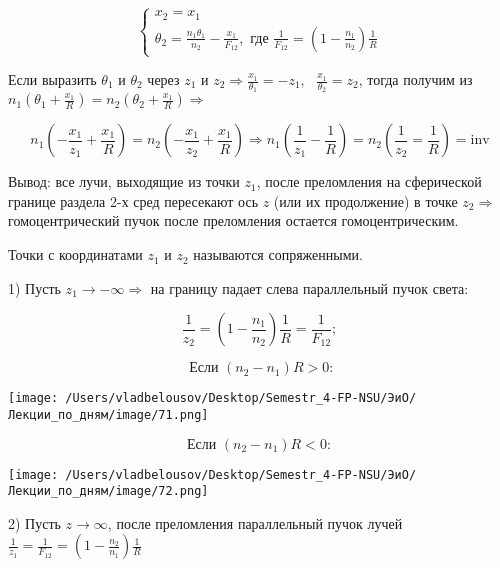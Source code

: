 \documentclass[12pt, a4paper]{report}
\begin{document}
\fi


\[ \begin{cases}
    x_2 =x_1  \\ 
    \displaystyle \theta_2 = \frac{n_1 \theta_1 }{n_2 } - \frac{x_1}{F_{12} } , \text{ где } \frac{1}{F_{12} } = \left( 1 - \frac{n_1}{n_2 }  \right)\frac{1}{R}    
\end{cases} \] 

Если выразить \( \theta_1  \) и \( \theta_2 \)  через \( z_1  \) и \(\displaystyle  z_2 \Rightarrow \frac{x_1}{\theta_1 } = -z_1 ,\text{ } \frac{x_1}{\theta_2 } = z_2    \), тогда получим из \( \displaystyle n_1 \left( \theta_1 +\frac{x_1}{R }\right) = n_2 \left( \theta_2 + \frac{x_1}{R }   \right)  \Rightarrow \)  

\[ n_1\left( - \frac{x_1}{z_1 } + \frac{x_1}{R }      \right) = n_2 \left( - \frac{x_1}{z_2 } + \frac{x_1}{R }   \right) \Rightarrow n_1\left( \frac{1}{z_1 } - \frac{1}{R }   \right) = n_2 \left( \frac{1}{z_2 } = \frac{1}{R }   \right) = \mathrm{inv}  \] 

Вывод: все лучи, выходящие из точки \( z_1 \), после преломления на сферической границе раздела 2-х сред пересекают ось \( z \) (или их продолжение) в точке \( z_2  \Rightarrow\)  гомоцентрический пучок после преломления остается гомоцентрическим.

Точки с координатами \( z_1 \) и \( z_2  \)  называются сопряженными.

1) Пусть \( z_1 \to  - \infty  \Rightarrow \) на границу падает слева параллельный пучок света: 

\[ \frac{1}{z_2 } = \left(  1 - \frac{n_1}{n_2 }  \right) \frac{1}{R } = \frac{1}{F_{12} } ;    \] 

\[ \text{ Если } (n_2 -n_1 )R >0: \] 

\begin{center}
    \texttt{[image: /Users/vladbelousov/Desktop/Semestr\_4-FP-NSU/ЭиО/Лекции\_по\_дням/image/71.png]}
\end{center}

\[ \text{Если } (n_2 - n_1 )R <0:   \] 

\begin{center}
    \texttt{[image: /Users/vladbelousov/Desktop/Semestr\_4-FP-NSU/ЭиО/Лекции\_по\_дням/image/72.png]}
\end{center} 

2) Пусть \( z \to  \infty   \), после преломления параллельный пучок лучей \( \displaystyle  \frac{1}{z_1 } = \frac{1}{F_{12} } = \left( 1 - \frac{n_2}{n_1 }  \right) \frac{1}{R}    \) 
\end{document}
